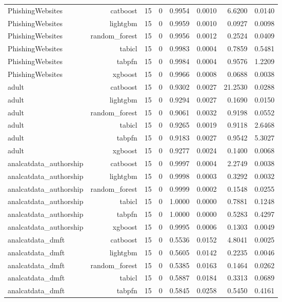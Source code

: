 \begin{table}[htbp]
\begin{tabular}{lrrrrrrr}
PhishingWebsites & catboost & 15 & 0 & 0.9954 & 0.0010 & 6.6200 & 0.0140 \\
PhishingWebsites & lightgbm & 15 & 0 & 0.9959 & 0.0010 & 0.0927 & 0.0098 \\
PhishingWebsites & random\_forest & 15 & 0 & 0.9956 & 0.0012 & 0.2524 & 0.0409 \\
PhishingWebsites & tabicl & 15 & 0 & 0.9983 & 0.0004 & 0.7859 & 0.5481 \\
PhishingWebsites & tabpfn & 15 & 0 & 0.9984 & 0.0004 & 0.9576 & 1.2209 \\
PhishingWebsites & xgboost & 15 & 0 & 0.9966 & 0.0008 & 0.0688 & 0.0038 \\
adult & catboost & 15 & 0 & 0.9302 & 0.0027 & 21.2530 & 0.0288 \\
adult & lightgbm & 15 & 0 & 0.9294 & 0.0027 & 0.1690 & 0.0150 \\
adult & random\_forest & 15 & 0 & 0.9061 & 0.0032 & 0.9198 & 0.0552 \\
adult & tabicl & 15 & 0 & 0.9265 & 0.0019 & 0.9118 & 2.6468 \\
adult & tabpfn & 15 & 0 & 0.9183 & 0.0027 & 0.9542 & 5.3027 \\
adult & xgboost & 15 & 0 & 0.9277 & 0.0024 & 0.1400 & 0.0068 \\
analcatdata\_authorship & catboost & 15 & 0 & 0.9997 & 0.0004 & 2.2749 & 0.0038 \\
analcatdata\_authorship & lightgbm & 15 & 0 & 0.9998 & 0.0003 & 0.3292 & 0.0032 \\
analcatdata\_authorship & random\_forest & 15 & 0 & 0.9999 & 0.0002 & 0.1548 & 0.0255 \\
analcatdata\_authorship & tabicl & 15 & 0 & 1.0000 & 0.0000 & 0.7881 & 0.1248 \\
analcatdata\_authorship & tabpfn & 15 & 0 & 1.0000 & 0.0000 & 0.5283 & 0.4297 \\
analcatdata\_authorship & xgboost & 15 & 0 & 0.9995 & 0.0006 & 0.1303 & 0.0049 \\
analcatdata\_dmft & catboost & 15 & 0 & 0.5536 & 0.0152 & 4.8041 & 0.0025 \\
analcatdata\_dmft & lightgbm & 15 & 0 & 0.5605 & 0.0142 & 0.2235 & 0.0046 \\
analcatdata\_dmft & random\_forest & 15 & 0 & 0.5385 & 0.0163 & 0.1464 & 0.0262 \\
analcatdata\_dmft & tabicl & 15 & 0 & 0.5887 & 0.0184 & 0.3313 & 0.0689 \\
analcatdata\_dmft & tabpfn & 15 & 0 & 0.5845 & 0.0258 & 0.5450 & 0.4161 \\

\end{tabular}
\end{table}
